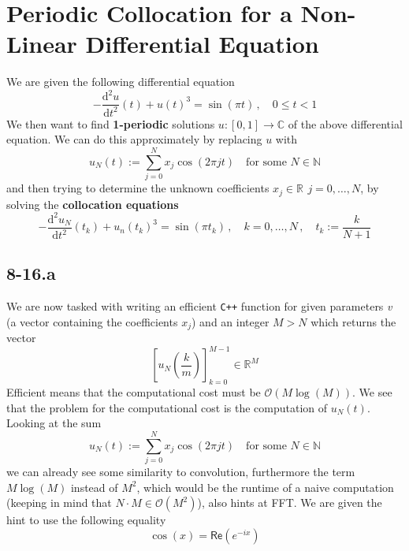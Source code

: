 \documentclass{article}
\newcommand\dm{\mathrm{d}}
\begin{document}
\section*{Periodic Collocation for a Non-Linear Differential Equation}
We are given the following differential equation
\begin{equation*}
    -\frac{\dm^{2}u}{\dm t^{2}}\left(t\right) + u\left(t\right)^{3} = \sin\left(\pi t\right)\,, \quad 0 \leq t < 1
\end{equation*}
We then want to find \textbf{1-periodic} solutions $u : \left[0,1\right] \to \mathbb{C}$ of the above differential equation. We can do this approximately by replacing $u$ with
\begin{equation*}
    u_{N}\left(t\right) := \sum_{j=0}^{N}x_{j}\cos\left(2\pi j t\right) \quad \text{for some } N \in \mathbb{N}
\end{equation*}
and then trying to determine the unknown coefficients $x_{j} \in \mathbb{R}\, \: j = 0, \dots,N$, by solving the \textbf{collocation equations}
\begin{equation*}
    -\frac{\dm^{2}u_{N}}{\dm t^{2}}\left(t_{k}\right) + u_{n}\left(t_{k}\right)^{3} = \sin\left(\pi t_{k}\right) \,,\quad k = 0, \dots, N\,,\quad t_{k} := \frac{k}{N +1}
\end{equation*}
\subsection*{8-16.a}
We are now tasked with writing an efficient \verb|C++| function for given parameters \textit{v} (a vector containing the coefficients $x_{j}$) and an integer $M > N$ which returns the vector 
\begin{equation*}
    \left[u_{N}\left(\frac{k}{m}\right)\right]_{k=0}^{M-1} \in \mathbb{R}^{M}
\end{equation*}
Efficient means that the computational cost must be $\mathcal{O}\left(M\log\left(M\right)\right)$.  We see that the problem for the computational cost is the computation of $u_{N}\left(t\right)$. Looking at the sum
\begin{equation*}
    u_{N}\left(t\right) := \sum_{j=0}^{N}x_{j}\cos\left(2\pi j t\right) \quad \text{for some } N \in \mathbb{N}
\end{equation*}
we can already see some similarity to convolution, furthermore the term $M\log\left(M\right)$ instead of $M^{2}$, which would be the runtime of a naive computation (keeping in mind that $N \cdot M \in \mathcal{O}\left(M^{2}\right)$), also hints at FFT. We are given the hint to use the following equality
\begin{equation*}
    \cos\left(x\right) = \mathsf{Re}\left(e^{-ix}\right)
\end{equation*}
\end{document}
